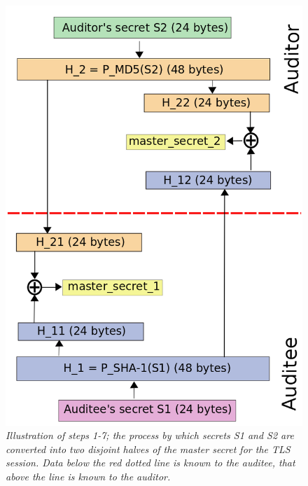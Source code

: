 \documentclass[10pt,a4paper]{article}
\begin{document}
\pagebreak

\begin{figure}[h]
\centering
\includegraphics[scale=0.3]{PMS_to_MS.png}
\caption{\emph{Illustration of steps 1-7; the process by which secrets S1 and S2 are converted into two disjoint halves of the master secret for the TLS session. Data below the red dotted line is known to the auditee, that above the line is known to the auditor.}}
\end{figure}
\end{document}
